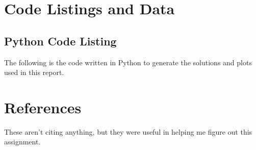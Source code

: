 \documentclass[10pt, oneside, letterpaper]{article}
\begin{document}
\newpage
\section{Code Listings and Data}

\subsection{Python Code Listing}
\label{code-listing-python}
The following is the code written in Python to generate the solutions and plots used in this report.


\newpage
\section{References}

These aren't citing anything, but they were useful in helping me figure out this assignment.
\end{document}
